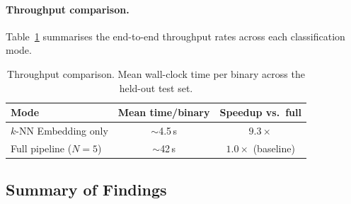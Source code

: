 \documentclass[pdflatex,sn-mathphys-num]{sn-jnl}
\begin{document}
\paragraph{Throughput comparison.}
Table~\ref{tab:throughput} summarises the end-to-end throughput rates across each classification mode.

\begin{table}[t]
\centering
\caption{Throughput comparison. Mean wall-clock time per binary
across the held-out test set.}
\label{tab:throughput}
\small
\begin{tabular}{@{}lcc@{}}
\toprule
\textbf{Mode} & \textbf{Mean time/binary} & \textbf{Speedup vs.\ full} \\
\midrule
$k$-NN Embedding only & $\sim$4.5\,s & $9.3\times$ \\
Full pipeline ($N{=}5$) & $\sim$42\,s & $1.0\times$ (baseline) \\
\bottomrule
\end{tabular}
\end{table}

\subsection{Summary of Findings}
\end{document}
